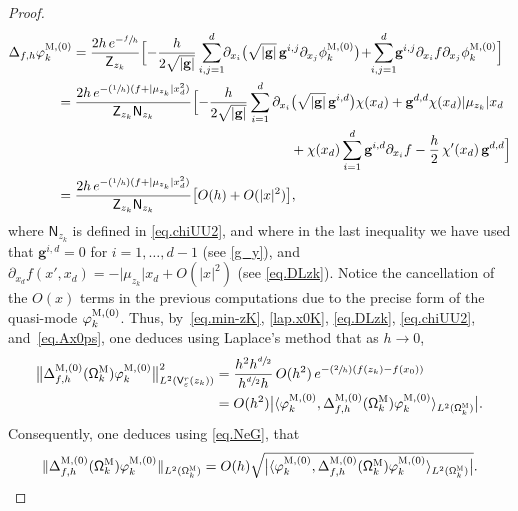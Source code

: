 \documentclass[10pt]{amsart}
\newcommand{\Psfrac}[2]{(\sfrac{#1}{#2})}
\newcommand{\mbf}[1]{\mathbf{#1}}
\let\ve\varepsilon
\theoremstyle{plain}
\theoremstyle{definition}
\begin{document}
\begin{proof}
\begin{align*}
\Delta_{f,h} \varphi^{\textsc{M},(0)}_k&=\frac{2h\, e^{-\sfrac f h}}{\mathsf Z_{z_k} }\Bigl[ -\frac{h}{2\sqrt{\vert \mbf g\vert}}\sum_{i,j=1}^d\hspace*{-1mm} \partial_{x_i}\bigl(\sqrt{\vert \mbf g\vert} \, \mbf g^{i,j} \partial_{x_j}\phi^{\textsc{M},(0)}_k \bigr) \!+ \hspace*{-1mm}\sum_{i,j=1}^d \hspace*{-1mm}\mbf g^{i,j} \partial_{x_i}f\partial_{x_j}\phi^{\textsc{M},(0)}_k\Bigr]\\
&\hspace*{-4mm}= \frac{2h \, e^{-\Psfrac 1h(f + \vert \mu_{z_k}\vert x_d^2)}}{\mathsf Z_{z_k}\mathsf N_{z_k}}
\Bigl[ -\frac{h}{2\sqrt{\vert \mbf g\vert}}\sum_{i=1}^d \partial_{x_i}\bigl(\sqrt{\vert \mbf g\vert} \, \mbf g^{i,d} \bigr)\chi(x_d) + \mbf g^{d,d}\chi (x_d)\vert \mu_{z_k}\vert x_d
\\
&\hspace*{5.65cm} + \chi(x_d) \sum_{i=1}^d \mbf g^{i,d} \partial_{x_i}f - \frac h2\,\chi'(x_d) \, \mbf g^{d,d} \Bigr] \\
&\hspace*{-4mm}=\frac{2h\, e^{-\Psfrac 1h(f + \vert \mu_{z_k}\vert x_d^2)}}{\mathsf Z_{z_k}\mathsf N_{z_k}}
\big[ O(h) + O(\vert x\vert^2) \big],
\end{align*}
where $\mathsf N_{z_k}$ is defined in \eqref{eq.chiUU2}, and where in the last inequality we have used that $\mbf g^{i,d}=0$ for $i=1,\ldots,d-1$ (see \eqref{g_y}), and $\partial_{x_d}f(x',x_d)= -\vert \mu_{z_k}\vert x_d+O(\vert x\vert^2)$ (see \eqref{eq.DLzk}).
Notice the cancellation of the $O(x)$ terms in the previous computations due to the precise form of the quasi-mode $\varphi^{\textsc{M},(0)}_k$.
Thus, by~\eqref{eq.min-zK}, \eqref{lap.x0K}, \eqref{eq.DLzk}, \eqref{eq.chiUU2}, and~\eqref{eq.Ax0ps}, one deduces using Laplace's method that as $h\to 0$,
\begin{align*}
\bigl\Vert \Delta_{f,h}^{\textsc{M}, (0)}(\mathsf \Omega_k^{\textsc{M}})\varphi^{\textsc{M},(0)}_k\bigr\Vert_{L^2(\mathsf V_{\ve}^r(z_k))}^2&= \frac{ h^2 h^{\sfrac{d}{2} } }{ h^{\sfrac{d}{2} } h}\, O(h^2) \, e^{-\Psfrac 2h (f(z_k)-f(x_0))} \\
&=O(h^2) \bigl\vert \langle \varphi^{\textsc{M},(0)}_k,\Delta_{f,h}^{\textsc{M}, (0)}(\mathsf \Omega_k^{\textsc{M}}) \varphi^{\textsc{M},(0)}_k \rangle_{L^2(\mathsf \Omega_k^{\textsc{M}})}\bigr\vert.
\end{align*}
Consequently, one deduces using \eqref{eq.NeG}, that
\begin{equation}\label{eq.Ax0ps2}
\Vert \Delta_{f,h}^{\textsc{M}, (0)}(\mathsf \Omega_k^{\textsc{M}})\varphi^{\textsc{M},(0)}_k\Vert_{L^2(\mathsf \Omega_k^{\textsc{M}})}=O(h) \sqrt{\bigl\vert \langle \varphi^{\textsc{M},(0)}_k,\Delta_{f,h}^{\textsc{M}, (0)}(\mathsf \Omega_k^{\textsc{M}}) \varphi^{\textsc{M},(0)}_k \rangle_{L^2(\mathsf \Omega_k^{\textsc{M}})}\bigr\vert}.
\end{equation}


\end{proof}
\end{document}
